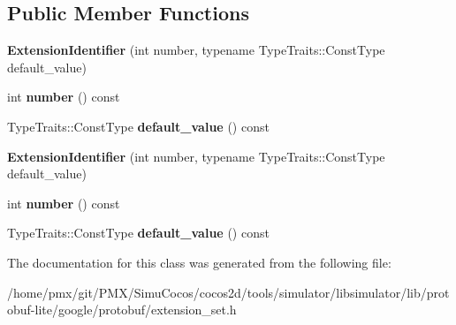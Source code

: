 \subsection*{Public Member Functions}
\begin{DoxyCompactItemize}
\item 
\mbox{\label{classgoogle_1_1protobuf_1_1internal_1_1ExtensionIdentifier_a12e28c8bde3d7998e22f7514d11fb846}} 
{\bfseries Extension\+Identifier} (int number, typename Type\+Traits\+::\+Const\+Type default\+\_\+value)
\item 
\mbox{\label{classgoogle_1_1protobuf_1_1internal_1_1ExtensionIdentifier_a7bd471b085aa4ecbed24bbe3bc6a6722}} 
int {\bfseries number} () const
\item 
\mbox{\label{classgoogle_1_1protobuf_1_1internal_1_1ExtensionIdentifier_a62c113ec3676487c791da8818cf62f4d}} 
Type\+Traits\+::\+Const\+Type {\bfseries default\+\_\+value} () const
\item 
\mbox{\label{classgoogle_1_1protobuf_1_1internal_1_1ExtensionIdentifier_a12e28c8bde3d7998e22f7514d11fb846}} 
{\bfseries Extension\+Identifier} (int number, typename Type\+Traits\+::\+Const\+Type default\+\_\+value)
\item 
\mbox{\label{classgoogle_1_1protobuf_1_1internal_1_1ExtensionIdentifier_a7bd471b085aa4ecbed24bbe3bc6a6722}} 
int {\bfseries number} () const
\item 
\mbox{\label{classgoogle_1_1protobuf_1_1internal_1_1ExtensionIdentifier_a62c113ec3676487c791da8818cf62f4d}} 
Type\+Traits\+::\+Const\+Type {\bfseries default\+\_\+value} () const
\end{DoxyCompactItemize}


The documentation for this class was generated from the following file\+:\begin{DoxyCompactItemize}
\item 
/home/pmx/git/\+P\+M\+X/\+Simu\+Cocos/cocos2d/tools/simulator/libsimulator/lib/protobuf-\/lite/google/protobuf/extension\+\_\+set.\+h\end{DoxyCompactItemize}
